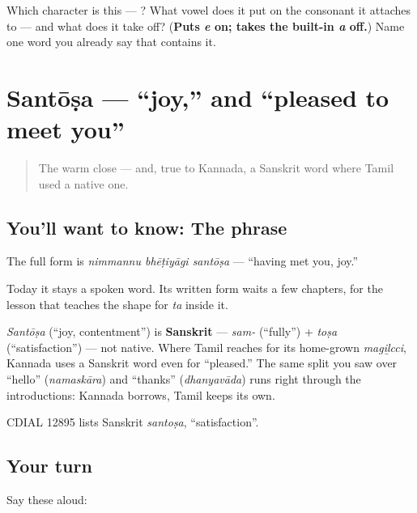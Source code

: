 \begin{tcolorbox}[breakable,colback=teal!4,colframe=teal!35!black,title={Before you move on}]
Which character is this — ? What vowel does it put on the consonant it attaches to — and what does it take off? (\textbf{Puts \emph{e} on; takes the built-in \emph{a} off.}) Name one word you already say that contains it.
\end{tcolorbox}
\section[\texorpdfstring{\kn{ಸಂತೋಷ} (santōṣa)}{ಸಂತೋಷ (santōṣa)}]{Santōṣa — \textquotedblleft{}joy,\textquotedblright{} and \textquotedblleft{}pleased to meet you\textquotedblright{}}

\label{lesson:KA-C02-santosha}



\begin{quote}
The warm close — and, true to Kannada, a Sanskrit word where Tamil used a native one.
\end{quote}

\subsection*{You'll want to know: The phrase}
The full form is \emph{nimmannu bhēṭiyāgi santōṣa} — \textquotedblleft{}having met you, joy.\textquotedblright{}

Today it stays a spoken word. Its written form waits a few chapters, for the lesson that teaches the shape for \emph{ta} inside it.

\begin{cousinweb}
\emph{Santōṣa} (\textquotedblleft{}joy, contentment\textquotedblright{}) is \textbf{Sanskrit} — \emph{sam-} (\textquotedblleft{}fully\textquotedblright{}) + \emph{toṣa} (\textquotedblleft{}satisfaction\textquotedblright{}) — not native. Where Tamil reaches for its home-grown \emph{magiḻcci}, Kannada uses a Sanskrit word even for \textquotedblleft{}pleased.\textquotedblright{} The same split you saw over \textquotedblleft{}hello\textquotedblright{} (\emph{namaskāra}) and \textquotedblleft{}thanks\textquotedblright{} (\emph{dhanyavāda}) runs right through the introductions: Kannada borrows, Tamil keeps its own.

CDIAL 12895 lists Sanskrit \emph{santoṣa}, \textquotedblleft{}satisfaction\textquotedblright{}.
\end{cousinweb}

\subsection*{Your turn}
Say these aloud:

